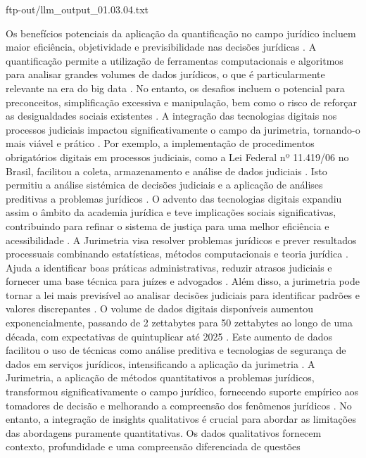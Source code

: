 \begin{agradecimentos}
    ftp-out/llm_output_01.03.04.txt 
    
    Os benefícios potenciais da aplicação da quantificação no campo jurídico incluem maior eficiência, objetividade e previsibilidade nas decisões jurídicas \cite{silva2023role,nunes2016jurimetria}. A quantificação permite a utilização de ferramentas computacionais e algoritmos para analisar grandes volumes de dados jurídicos, o que é particularmente relevante na era do big data \cite{silva2023role,nunes2016jurimetria}. No entanto, os desafios incluem o potencial para preconceitos, simplificação excessiva e manipulação, bem como o risco de reforçar as desigualdades sociais existentes \cite{silva2023role,nunes2016jurimetria}. A integração das tecnologias digitais nos processos judiciais impactou significativamente o campo da jurimetria, tornando-o mais viável e prático \cite{silva2023role,103390fi9040068}. Por exemplo, a implementação de procedimentos obrigatórios digitais em processos judiciais, como a Lei Federal nº 11.419/06 no Brasil, facilitou a coleta, armazenamento e análise de dados judiciais \cite{103390fi9040068}. Isto permitiu a análise sistémica de decisões judiciais e a aplicação de análises preditivas a problemas jurídicos \cite{silva2023role,103390fi9040068}. O advento das tecnologias digitais expandiu assim o âmbito da academia jurídica e teve implicações sociais significativas, contribuindo para refinar o sistema de justiça para uma melhor eficiência e acessibilidade \cite{1023071190721,10.3390/fi9040068,10.1080/07329113.2015.1046739,10.5040/9781350220645,de20 10jurimetria ,zabala2019décadas,10.1057/s41599-020-00557-0,na leiviewmetadadoscitaçãosimilarpapers2014,10.1590/dados.2022.65.3.267,10.2307/2654208,demortain2019politics,10.1057/s41599-02 0-0396-5,10.1007/s11186-021-09453-1 ,comptabilitat0018,salais2016quantificação,10.1017/s0003975609000150,supiot2018,nunes201}. A Jurimetria visa resolver problemas jurídicos e prever resultados processuais combinando estatísticas, métodos computacionais e teoria jurídica \cite{silva2023role}. Ajuda a identificar boas práticas administrativas, reduzir atrasos judiciais e fornecer uma base técnica para juízes e advogados \cite{silva2023role}. Além disso, a jurimetria pode tornar a lei mais previsível ao analisar decisões judiciais para identificar padrões e valores discrepantes \cite{103390fi9040068}. O volume de dados digitais disponíveis aumentou exponencialmente, passando de 2 zettabytes para 50 zettabytes ao longo de uma década, com expectativas de quintuplicar até 2025 \cite{silva2023role}. Este aumento de dados facilitou o uso de técnicas como análise preditiva e tecnologias de segurança de dados em serviços jurídicos, intensificando a aplicação da jurimetria \cite{silva2023role}. A Jurimetria, a aplicação de métodos quantitativos a problemas jurídicos, transformou significativamente o campo jurídico, fornecendo suporte empírico aos tomadores de decisão e melhorando a compreensão dos fenômenos jurídicos \cite{10.3390/fi9040068,10.5040/9781350220645,de2010jurimetrics}. No entanto, a integração de insights qualitativos é crucial para abordar as limitações das abordagens puramente quantitativas. Os dados qualitativos fornecem contexto, profundidade e uma compreensão diferenciada de questões 
\end{agradecimentos}
